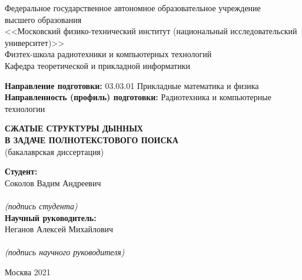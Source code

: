 \begin{center}
    Федеральное государственное автономное образовательное учреждение\\
    высшего образования\\
    <<Московский физико-технический институт (национальный исследовательский университет)>>\\
    Физтех-школа радиотехники и компьютерных технологий\\
    Кафедра теоретической и прикладной информатики\\
\end{center}

\vspace{2mm}

\begin{flushleft}
    \textbf{Направление подготовки:} 03.03.01 Прикладные математика и физика\\
    \textbf{Направленность (профиль) подготовки:} Радиотехника и компьютерные технологии\\
\end{flushleft}

\vspace{24mm}

\begin{center}
    \large{\textbf{СЖАТЫЕ СТРУКТУРЫ ДЫННЫХ\\В ЗАДАЧЕ ПОЛНОТЕКСТОВОГО ПОИСКА}}\\
    (бакалаврская диссертация)\\
\end{center}

\vspace{20mm}

\hspace{90mm}
\begin{minipage}{0.4\textwidth}
    \begin{flushleft}
        \textbf{Студент:}\\Соколов Вадим Андреевич\\
        \vspace{4mm}
        \hrulefill\\
        {\centering\scriptsize\textit{(подпись студента)}\\}
        \textbf{Научный руководитель:}\\Неганов Алексей Михайлович\\
        \vspace{4mm}
        \hrulefill\\
        {\centering\scriptsize\textit{(подпись научного руководителя)}\\}
    \end{flushleft}
\end{minipage}

\vspace*{\fill}

\begin{center}
    Москва 2021
\end{center}

\thispagestyle{empty}